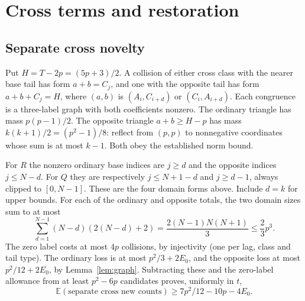 \documentclass[10pt]{amsart}
\theoremstyle{remark}
\newcommand{\E}{\mathbb E}
\begin{document}
\section{Cross terms and restoration}\label{sec:cross}
\subsection{Separate cross novelty}
Put $H=T-2p=(5p+3)/2$. A collision of either cross class with the
nearer base tail has form $a+b=C_j$, and one with the opposite tail
has form $a+b+C_j=H$, where $(a,b)$ is $(A_i,C_{i+d})$ or
$(C_i,A_{i+d})$. Each congruence is a three-label graph with both
coefficients nonzero. The ordinary triangle has mass $p(p-1)/2$.
The opposite triangle $a+b\ge H-p$ has mass
$k(k+1)/2=(p^2-1)/8$: reflect from $(p,p)$ to nonnegative coordinates
whose sum is at most $k-1$. Both obey the established norm bound.

For $R$ the nonzero ordinary base indices are $j\ge d$ and the
opposite indices $j\le N-d$. For $Q$ they are respectively
$j\le N+1-d$ and $j\ge d-1$, always clipped to $[0,N-1]$.
These are the four domain forms above. Include $d=k$ for upper bounds.
For each of the ordinary and opposite totals, the two domain sizes sum
to at most
\begin{equation}\label{eq:crossdomainsize}
 \sum_{d=1}^{N-1}(N-d)(2(N-d)+2)
 =\frac{2(N-1)N(N+1)}3\le\frac23p^3.
\end{equation}
The zero label costs at most $4p$ collisions, by injectivity (one per
lag, class and tail type). The ordinary loss is at most $p^2/3+2E_0$,
and the opposite loss at most $p^2/12+2E_0$, by Lemma~\ref{lem:graph}.
Subtracting these and the zero-label allowance from at least
$p^2-6p$ candidates proves, uniformly in $t$,
\begin{equation}\label{eq:separatecross}
 \E(\text{separate cross new counts})\ge7p^2/12-10p-4E_0.
\end{equation}
\end{document}
